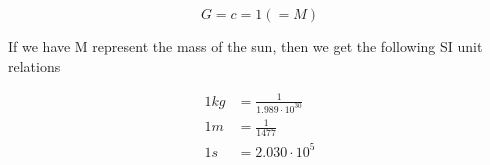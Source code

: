 \begin{equation}
    G = c = 1 \left(=M\right)
\end{equation}

If we have M represent the mass of the sun, then we get the following SI unit relations

\begin{align*}
    1kg &= \frac{1}{1.989 \cdot 10^{30}} \\
    1m &= \frac{1}{1477} \\
    1s &= 2.030 \cdot 10^5
\end{align*}



    






% 